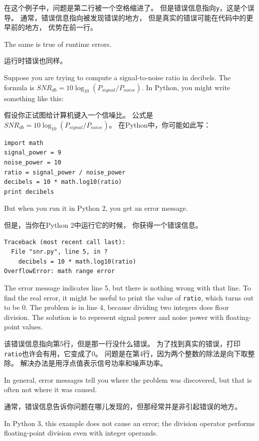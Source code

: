 \documentclass[10pt]{book}
\begin{document}
\begin{CJK}{UTF8}{gbsn}
在这个例子中，问题是第二行被一个空格缩进了。
但是错误信息指向{\tt y}，这是个误导。
通常，错误信息指向被发现错误的地方，
但是真实的错误可能在代码中的更早前的地方，
优势在前一行。

The same is true of runtime errors.  

运行时错误也同样。

Suppose you are trying
to compute a signal-to-noise ratio in decibels.  The formula
is $SNR_{db} = 10 \log_{10} (P_{signal} / P_{noise})$.  In Python,
you might write something like this:

假设你正试图给计算机键入一个信噪比。
公式是$SNR_{db} = 10 \log_{10} (P_{signal} / P_{noise})$。
在Python中，你可能如此写：

\begin{verbatim}
import math
signal_power = 9
noise_power = 10
ratio = signal_power / noise_power
decibels = 10 * math.log10(ratio)
print decibels
\end{verbatim}
%
But when you run it in Python 2, you get an error message.

但是，当你在Python 2中运行它的时候，
你获得一个错误信息。

\begin{verbatim}
Traceback (most recent call last):
  File "snr.py", line 5, in ?
    decibels = 10 * math.log10(ratio)
OverflowError: math range error
\end{verbatim}
%
The error message indicates line 5, but there is nothing
wrong with that line.  To find the real error, it might be
useful to print the value of {\tt ratio}, which turns out to
be 0.  The problem is in line 4, because dividing two integers
does floor division.  The solution is to represent signal power
and noise power with floating-point values.

该错误信息指向第5行，但是那一行没什么错误。
为了找到真实的错误，打印{\tt ratio}也许会有用，它变成了0。
问题是在第4行，因为两个整数的除法是向下取整除。
解决办法是用浮点值表示信号功率和噪声功率。

In general, error messages tell you where the problem was discovered, 
but that is often not where it was caused.

通常，错误信息告诉你问题在哪儿发现的，但那经常并是非引起错误的地方。

In Python 3, this example does not cause an error; the division operator
performs floating-point division even with integer operands.


\end{CJK}
\end{document}
